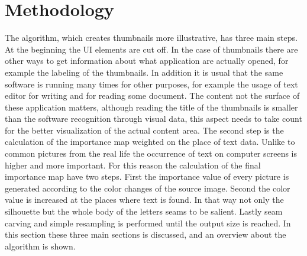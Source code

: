 \documentclass[draft,final]{vutinfth} %
\begin{document}
\chapter{Methodology}
The algorithm, which creates thumbnails more illustrative, has three main steps.
At the beginning the UI elements are cut off.
In the case of thumbnails there are other ways to get information about what application are actually opened, for example the labeling of the thumbnails.
In addition it is usual that the same software is running many times for other purposes, for example the usage of text editor for writing and for reading some document.
The content  not the surface of these application matters, although reading the title of the thumbnails is smaller than the software recognition through visual data, this aspect needs to take count for the better visualization of the actual content area.
The second step is the calculation of the importance map weighted on the place of text data.
Unlike to common pictures from the real life the occurrence of text on computer screens is higher and more important.
For this reason the calculation of the final importance map have two steps.
First the importance value of every picture is generated according to the color changes of the source image.
Second the color value is increased at the places where text is found.
In that way not only the silhouette but the whole body of the letters seams to be salient.
Lastly seam carving and simple resampling is performed  until the output size is reached.
In this section these three main sections is discussed, and an overview about the algorithm is shown.
\end{document}
